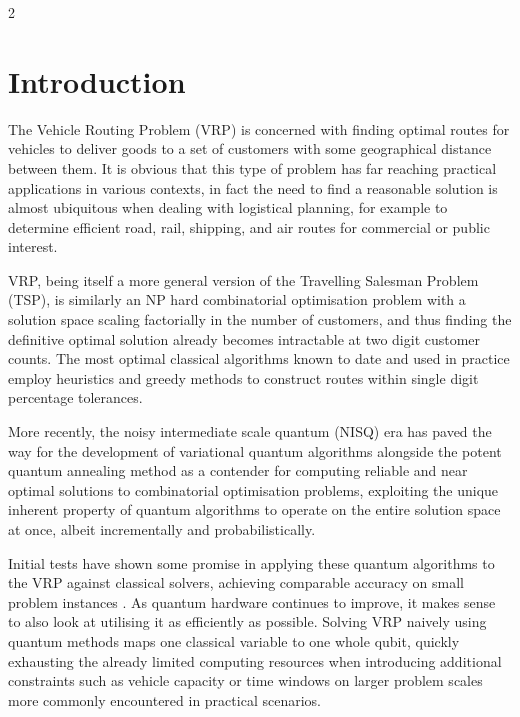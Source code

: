 \documentclass [10pt]{article}
\begin{document}
\begin {multicols}{2}

%

\section {Introduction}
The Vehicle Routing Problem (VRP) is concerned with finding optimal routes
for vehicles to deliver goods to a set of customers with some geographical
distance between them. It is obvious that this type of problem has far
reaching practical applications in various contexts, in fact the need to find
a reasonable solution is almost ubiquitous when dealing with logistical
planning, for example to determine efficient road, rail, shipping, and air
routes for commercial or public interest.

VRP, being itself a more general version of the Travelling Salesman Problem
(TSP), is similarly an NP hard \cite{vrp} combinatorial optimisation problem
with a solution space scaling factorially in the number of customers, and thus
finding the definitive optimal solution already becomes intractable at
two digit customer counts. The most optimal classical algorithms known to date
and used in practice employ heuristics and greedy methods to construct routes
within single digit percentage tolerances.

More recently, the noisy intermediate scale quantum (NISQ) era \cite{nisq} has
paved the way for the development of variational quantum algorithms alongside
the potent quantum annealing \cite{annealintro} method as a contender for
computing reliable and near optimal solutions to combinatorial optimisation
problems, exploiting the unique inherent property of quantum algorithms to
operate on the entire solution space at once, albeit incrementally and
probabilistically.

Initial tests have shown some promise in applying these quantum algorithms
to the VRP against classical solvers, achieving comparable accuracy on
small problem instances \cite{cvrpanneal} \cite{effvrp}.
As quantum hardware continues to improve, it makes
sense to also look at utilising it as efficiently as possible. Solving VRP
naively using quantum methods maps one classical variable to one whole qubit,
\cite{effvrp}
quickly exhausting the already limited computing resources when introducing
additional constraints such as vehicle capacity or time windows on larger
problem scales more commonly encountered in practical scenarios.


\end{multicols}
\end{document}
